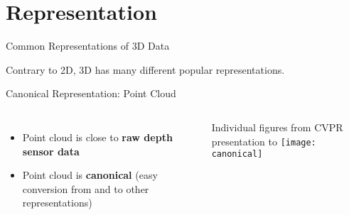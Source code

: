 %     


\section{Representation}
\begin{frame}[c]{Common Representations of 3D Data}
    
    \Large
    \vspace{1em}
    Contrary to 2D, 3D has many different popular representations.
\end{frame}


\begin{frame}[c]{Canonical Representation: Point Cloud}
    \large
    \begin{columns}
        \begin{itemize}
            \item Point cloud is close to \textbf{raw depth sensor data}
            \item Point cloud is \textbf{canonical} (easy conversion from and to other representations)
        \end{itemize}
        \color{ocre}
        \normalsize
        \vspace{2em}
        Individual figures from CVPR presentation to \cite{qi2017pointnet}
        \texttt{[image: canonical]}
    \end{columns}
\end{frame}

